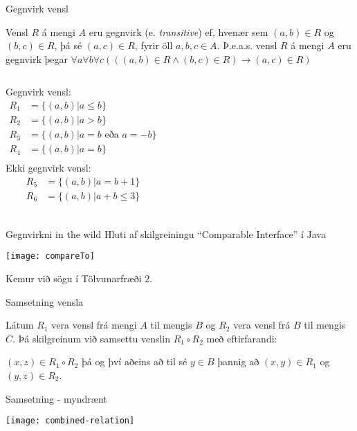 \documentclass[handout]{beamer}
\begin{document}
\begin{frame}[fragile]{Gegnvirk vensl}
\begin{tcolorbox}[title=Gegnvirk vensl]
Vensl $R$ á mengi $A$ eru gegnvirk (e. \emph{transitive}) ef, hvenær sem $(a, b) \in R$ og $(b, c) \in R$, þá sé $(a, c) \in R$, fyrir öll $a, b, c \in A$. Þ.e.a.s. vensl $R$ á mengi $A$ eru gegnvirk þegar $\forall a\forall b\forall c(((a, b) \in R \land (b, c) \in R) \to (a, c) \in R)$
\end{tcolorbox}
\begin{columns}
Gegnvirk vensl:
\begin{align*}
R_1 &= \{(a, b)|a \leq b\}\\
R_2 &= \{(a, b)|a > b\}\\
R_3 &= \{(a, b)|a = b \text{ eða } a = -b\}\\
R_4 &= \{(a, b)|a = b\}\\
\end{align*}
Ekki gegnvirk vensl:
\begin{align*}
R_5 &= \{(a, b)|a = b+1\}\\
R_6 &= \{(a, b)|a+b \leq 3\}\\
\end{align*}
\end{columns}
\end{frame}

\begin{frame}{Gegnvirkni in the wild}
    Hluti af skilgreiningu ``Comparable Interface'' í Java
    \begin{center}
        \texttt{[image: compareTo]}
    \end{center}
    Kemur við sögu í Tölvunarfræði 2.
\end{frame}

\begin{frame}{Samsetning vensla}
\begin{tcolorbox}[title=Samsetning vensla]
Látum $R_1$ vera vensl frá mengi $A$ til mengis $B$ og $R_2$ vera vensl frá $B$ til mengis $C$. Þá skilgreinum við samsettu venslin $R_1 \circ R_2$ með eftirfarandi:

$(x,z) \in R_1 \circ R_2$ þá og því aðeins að til sé $y \in B$ þannig að $(x,y) \in R_1$ og $(y,z) \in R_2$.
\end{tcolorbox}
\end{frame}

\begin{frame}{Samsetning - myndrænt}
\begin{center}
\texttt{[image: combined-relation]}
\end{center}
\end{frame}
\end{document}
